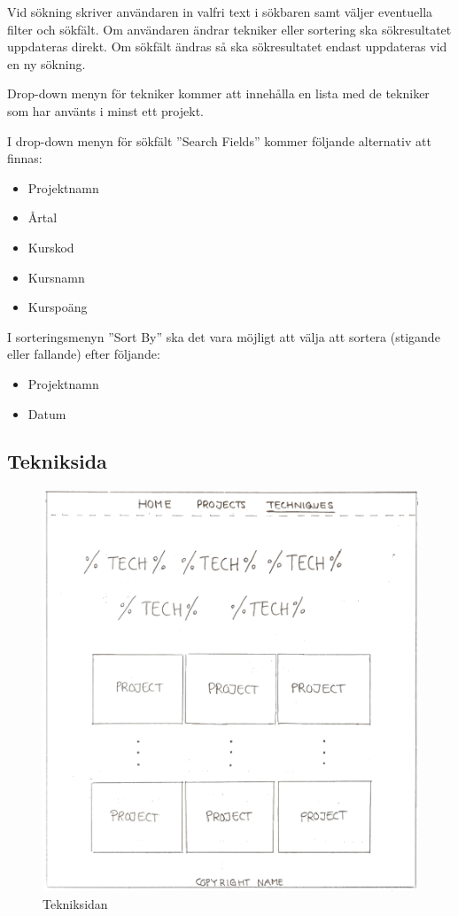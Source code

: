 \documentclass{TDP003mall}
\begin{document}
Vid sökning skriver användaren in valfri text i sökbaren samt väljer eventuella filter och sökfält.
Om användaren ändrar tekniker eller sortering ska sökresultatet uppdateras direkt. Om sökfält ändras så ska sökresultatet endast uppdateras vid en ny sökning.

Drop-down menyn för tekniker kommer att innehålla en lista med de tekniker som har använts i minst ett projekt.

I drop-down menyn för sökfält ''Search Fields'' kommer följande alternativ att finnas:
\begin{itemize}
  \item Projektnamn
  \item Årtal
  \item Kurskod
  \item Kursnamn
  \item Kurspoäng
\end{itemize}

I sorteringsmenyn ''Sort By'' ska det vara möjligt att välja att sortera (stigande eller fallande) efter följande:
\begin{itemize}
  \item Projektnamn
  \item Datum
\end{itemize}


\pagebreak
\subsection{Tekniksida}

\begin{figure}[h]
  \centering
  \includegraphics[width=120mm]{5_techniques.jpg}
  \caption{Tekniksidan} \label{fig4:Techniques}
\end{figure}
\end{document}
